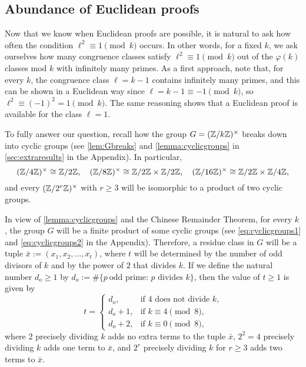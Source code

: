 \documentclass[../main.tex]{subfiles}
\begin{document}
\subsection{Abundance of Euclidean proofs}\label{sec:sizeEuc}

Now that we know when Euclidean proofs are possible, it is natural to ask how often the condition $\ell^2\equiv 1 \pmod{k}$ occurs. In other words, for a fixed $k$, we ask ourselves how many congruence classes satisfy $\ell^2\equiv 1\pmod{k}$ out of the $\varphi(k)$ classes mod $k$ with infinitely many primes. As a first approach, note that, for every $k$, the congruence class $\ell=k-1$ contains infinitely many primes, and this can be shown in a Euclidean way since $\ell = k-1 \equiv -1 \pmod{k}$, so $\ell^2\equiv(-1)^2=1 \pmod{k}$. The same reasoning shows that a Euclidean proof is available for the class $\ell=1$.

To fully answer our question, recall how the group $G=(\mathbb{Z}/k\mathbb{Z})^\times$ breaks down into cyclic groups (see \cref{lem:Gbreaks} and \cref{lemma:cyclicgroups} in \cref{sec:extraresults} in the Appendix). In particular,
\begin{equation*}
	(\mathbb{Z}/4\mathbb{Z})^\times\cong \mathbb{Z}/2\mathbb{Z}, \quad (\mathbb{Z}/8\mathbb{Z})^\times\cong \mathbb{Z}/2\mathbb{Z} \times \mathbb{Z}/2\mathbb{Z}, \quad (\mathbb{Z}/16\mathbb{Z})^\times\cong \mathbb{Z}/2\mathbb{Z} \times \mathbb{Z}/4\mathbb{Z},
\end{equation*}
and every $(\mathbb{Z}/2^r\mathbb{Z})^\times$ with $r\geqslant 3$ will be isomorphic to a product of two cyclic groups.

In view of \cref{lemma:cyclicgroups} and the Chinese Remainder Theorem, for every $k$, the group $G$ will be a finite product of some cyclic groups (see \cref{eq:cyclicgroups1} and \cref{eq:cyclicgroups2} in the Appendix). Therefore, a residue class in $G$ will be a tuple $\bar{x}:=(x_1, x_2,\dots, x_t)$, where $t$ will be determined by the number of odd divisors of $k$ and by the power of $2$ that divides $k$. If we define the natural number $d_o\geqslant 1$ by $d_o:=\#\{p \ \text{odd prime: $p$ divides $k$}\}$, then the value of $t\geqslant 1$ is given by
	\begin{equation}\label{eq:tdef}
		t=
		\begin{cases}
			d_o, & \text{if $4$ does not divide $k$,}\\
			d_o+1, & \text{if $k\equiv 4\pmod{8}$,}\\
			d_o+2, & \text{if $k\equiv 0 \pmod{8}$,}
		\end{cases}
	\end{equation}
where $2$ precisely dividing $k$ adds no extra terms to the tuple $\bar{x}$,  $2^2=4$ precisely dividing $k$ adds one term to $\bar{x}$, and $2^r$ precisely dividing $k$ for $r\geqslant 3$ adds two terms to $\bar{x}$.
\end{document}
